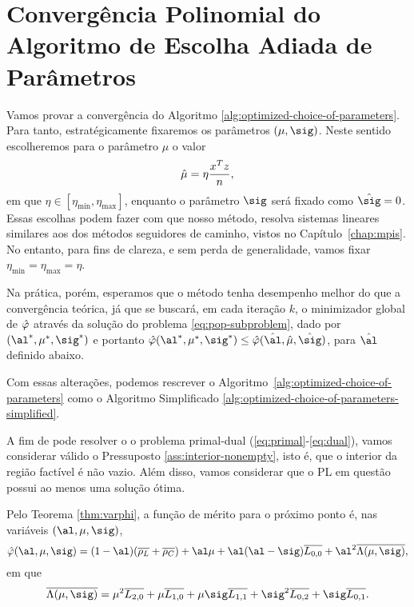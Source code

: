 

\section{Convergência  Polinomial do Algoritmo de Escolha Adiada de Parâmetros}



Vamos provar  a convergência do Algoritmo \ref{alg:optimized-choice-of-parameters}. Para tanto, estratégicamente fixaremos os parâmetros $(\mu,\sig)$. Neste sentido escolheremos para o parâmetro  $\mu$ o valor \[\hat{\mu}=\eta\dfrac{x^Tz}{n},
\] 
em que $\eta\in [\eta_{\min},\eta_{\max} ]$, enquanto o parâmetro $\sig$ será fixado como $\nextsig = 0$. Essas escolhas  podem fazer com que nosso método, resolva  sistemas lineares similares aos dos métodos seguidores de caminho, vistos no Capítulo~\ref{chap:mpis}.  No entanto, para fins de clareza, e sem perda de generalidade, vamos fixar $\eta_{\min}=\eta_{\max}=\eta $. 


 Na prática, porém, esperamos que  o método  tenha desempenho melhor do que a convergência teórica, já que se buscará, em cada iteração $k$,
o minimizador global de $\hat{\varphi}$ através da solução do problema \eqref{eq:pop-subproblem}, dado por $(\al^*,\mu^*,\sig^*)$ e portanto	$\nextphi(\al^*,\mu^*,\sig^*)\leq \nextphi(\hat{\al},\nextmu,\nextsig)$, para  $\hat{\al}$ definido abaixo.


Com essas alterações, podemos rescrever o Algoritmo~\ref{alg:optimized-choice-of-parameters} como o  Algoritmo Simplificado \ref{alg:optimized-choice-of-parameters-simplified}.


A fim de pode  resolver o o problema primal-dual (\ref{eq:primal}-\ref{eq:dual}), vamos considerar válido o Pressuposto \ref{ass:interior-nonempty}, isto é, que o interior da região factível é não vazio. Além disso, vamos considerar que o \ac{PL} em questão possui ao menos uma solução ótima. 





Pelo Teorema \ref{thm:varphi}, a função de mérito para o próximo ponto   é, nas variáveis  $(\al,\mu,\sig)$,
\begin{equation*}
{\nextphi}(\al,\mu,\sig) =  (1-\al)(\dbvec{\rho_L} +
\dbvec{\rho_C}) + \al\mu + \al(\al-\sig)\dbvec{L_{0,0}} +
\al^2\dbvec{\Lambda(\mu,\sig)} ,
\end{equation*}
em que 
\[
\dbvec{\Lambda(\mu,\sig)} = \mu^2
 \dbvec{L_{2,0}} + \mu \dbvec{L_{1,0}} + 	\mu \sig \dbvec{L_{1,1}} +
 \sig^2 \dbvec{L_{0,2}} + \sig \dbvec{L_{0,1}}.
 \]


